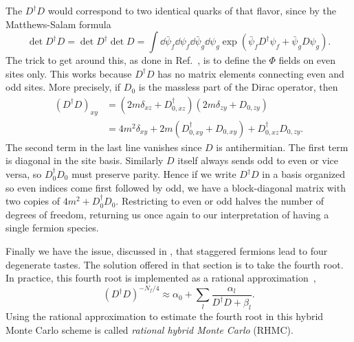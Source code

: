 The $D^\dagger D$ would correspond to two identical quarks of that flavor, since
by the Matthews-Salam formula
\begin{equation}
\det D^\dagger D = \det D^\dagger \det D
=\int \dd{\bar{\psi}_f}\dd{\psi_f}\dd{\bar{\psi}_g}\dd{\psi_g}
\exp\left(\bar{\psi}_fD^\dagger\psi_f+\bar{\psi}_gD \psi_g\right).
\end{equation}
The trick to get around this, as done in 
Ref.~\cite{gottlieb_hybrid-molecular-dynamics_1987}, is to define the
$\Phi$ fields on even sites only. This works because $D^\dagger D$ has no
matrix elements connecting even and odd sites. More precisely, if
$D_0$ is the massless part of the Dirac operator, then
\begin{equation}\begin{aligned}
\left(D^\dagger D\right)_{xy}
&=\left(2m\delta_{xz}+D^\dagger_{0,xz}\right)
  \left(2m\delta_{zy}+D_{0,zy}\right)\\
&=4m^2\delta_{xy}+2m\left(D^\dagger_{0,xy}+D_{0,xy}\right)+D^\dagger_{0,xz}D_{0,zy}.
\end{aligned}\end{equation}
The second term in the last line vanishes since $D$ is antihermitian.
The first term is diagonal in the site basis. Similarly $D$ itself always sends
odd to even or vice versa, so $D_0^\dagger D_0$ must preserve parity.
Hence if we write $D^\dagger D$ in a basis organized so even indices come first 
followed by odd, we have a block-diagonal matrix with two copies of
$4m^2+D_0^\dagger D_0$. Restricting to even or odd halves the number of degrees
of freedom, returning us once again to our interpretation of having a single
fermion species.

Finally we have the issue, discussed in
, that staggered fermions lead to four degenerate tastes.
The solution offered in that section is to take the fourth root. In practice,
this fourth root is implemented as a rational 
approximation~\cite{clark_rhmc_2004,clark_rational_2006},
\begin{equation}
\left(D^\dagger D\right)^{-N_f/4}\approx\alpha_0+\sum_l\frac{\alpha_l}{D^\dagger
D+\beta_l}.
\end{equation}
Using the rational approximation to estimate the fourth root in this hybrid
Monte Carlo scheme is called {\it rational hybrid Monte Carlo}
(RHMC).


